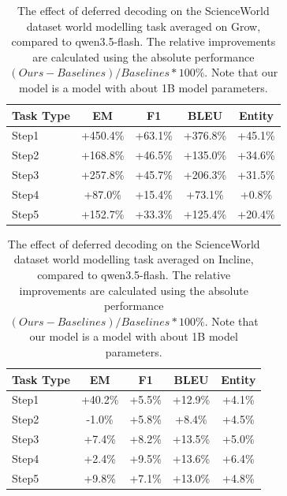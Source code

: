 \begin{table}[h]
\centering
    \setlength\tabcolsep{15pt}
    \setlength\extrarowheight{0pt}
\caption{The effect of deferred decoding on the ScienceWorld dataset \citep{wang-etal-2022-scienceworld} world modelling task averaged on Grow, compared to qwen3.5-flash. The relative improvements are calculated using the absolute performance $(Ours - Baselines) / Baselines * 100\%$. Note that our model is a model with about 1B model parameters.}
\label{tab:scienceworld19}
\begin{tabular}{lcccc}
\toprule
\textbf{Task Type} & \textbf{EM} & \textbf{F1}
  & \textbf{BLEU} & \textbf{Entity}\\
\midrule
Step1 & +450.4\% & +63.1\% & +376.8\% & +45.1\% \\
Step2 & +168.8\% & +46.5\% & +135.0\% & +34.6\% \\
Step3 & +257.8\% & +45.7\% & +206.3\% & +31.5\% \\
Step4 & +87.0\% & +15.4\% & +73.1\% & +0.8\% \\
Step5 & +152.7\% & +33.3\% & +125.4\% & +20.4\% \\

\bottomrule
\end{tabular}
\end{table}


\begin{table}[h]
\centering
    \setlength\tabcolsep{15pt}
    \setlength\extrarowheight{0pt}
\caption{The effect of deferred decoding on the ScienceWorld dataset \citep{wang-etal-2022-scienceworld} world modelling task averaged on Incline, compared to qwen3.5-flash. The relative improvements are calculated using the absolute performance $(Ours - Baselines) / Baselines * 100\%$. Note that our model is a model with about 1B model parameters.}
\label{tab:scienceworld20}
\begin{tabular}{lcccc}
\toprule
\textbf{Task Type} & \textbf{EM} & \textbf{F1}
  & \textbf{BLEU} & \textbf{Entity}\\
\midrule
Step1 & +40.2\% & +5.5\% & +12.9\% & +4.1\% \\
Step2 & -1.0\% & +5.8\% & +8.4\% & +4.5\% \\
Step3 & +7.4\% & +8.2\% & +13.5\% & +5.0\% \\
Step4 & +2.4\% & +9.5\% & +13.6\% & +6.4\% \\
Step5 & +9.8\% & +7.1\% & +13.0\% & +4.8\% \\

\bottomrule
\end{tabular}
\end{table}



